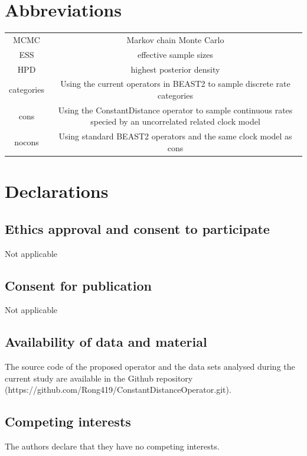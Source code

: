 \documentclass{bmcart}
\begin{document}
\begin{backmatter}
\section*{Abbreviations}
\begin{table}[h!]
\raggedright
\begin{tabular}{cc}
MCMC&Markov chain Monte Carlo\\
ESS&effective sample sizes\\ 
HPD&highest posterior density\\
categories & Using the current operators in BEAST2 to sample discrete rate categories\\
cons & Using the ConstantDistance operator to sample continuous rates specied by an uncorrelated related clock model\\
nocons & Using standard BEAST2 operators and the same clock model as cons
\end{tabular}
\end{table}

\section*{Declarations}
\subsection*{Ethics approval and consent to participate}
Not applicable

\subsection*{Consent for publication}
Not applicable

\subsection*{Availability of data and material}
The source code of the proposed operator and the data sets analysed during the current study are available in the Github repository (https://github.com/Rong419/ConstantDistanceOperator.git).  

\subsection*{Competing interests}
The authors declare that they have no competing interests.


\end{backmatter}
\end{document}
